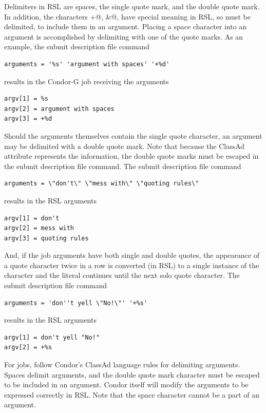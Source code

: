Delimiters in RSL are spaces,
the single quote mark,
and the double quote mark.
In addition,
the characters \verb@+@, \verb@&@, \verb@%@, \verb@(@, and \verb@)@
have special meaning in RSL, so must be delimited,
to include them in an argument.
Placing a space character into an argument is accomplished
by delimiting with one of the quote marks.
As an example, the submit description file command
\footnotesize
\begin{verbatim}
arguments = '%s' 'argument with spaces' '+%d'
\end{verbatim}
\normalsize
results in the Condor-G job receiving the arguments
\begin{verbatim}
argv[1] = %s
argv[2] = argument with spaces
argv[3] = +%d
\end{verbatim}

Should the arguments themselves contain the single quote character,
an argument may be delimited with a double quote mark.
Note that because the ClassAd attribute 
represents the information,
the double quote marks must be escaped in the submit description
file command.
The submit description file command 
\footnotesize
\begin{verbatim}
arguments = \"don't\" \"mess with\" \"quoting rules\"
\end{verbatim}
\normalsize
results in the RSL arguments
\begin{verbatim}
argv[1] = don't
argv[2] = mess with
argv[3] = quoting rules
\end{verbatim}

And, if the job arguments have both single and double quotes,
the appearance of a quote character twice in a
row is converted (in RSL) to a single instance of the character and the literal
continues until the next solo quote character.
The submit description file command 
\footnotesize
\begin{verbatim}
arguments = 'don''t yell \"No!\"' '+%s'
\end{verbatim}
\normalsize
results in the RSL arguments
\begin{verbatim}
argv[1] = don't yell "No!"
argv[2] = +%s
\end{verbatim}

For  jobs,
follow Condor's ClassAd language rules for delimiting arguments.
Spaces delimit arguments,
and the double quote mark character must be escaped to be included
in an argument.
Condor itself will modify the arguments to be expressed correctly
in RSL.
Note that the space character cannot be a part of an argument.

